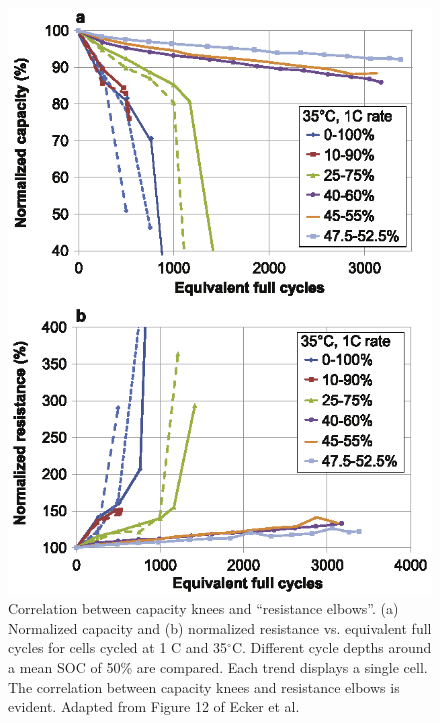 \documentclass[journal=jpclcd,manuscript=article]{achemso}
\begin{document}
\begin{figure}[!ht]
\centering
\includegraphics[scale=1.0]{figures/ecker_capacity_vs_dcr.eps}
\caption{Correlation between capacity knees and ``resistance elbows''.
(a) Normalized capacity and (b) normalized resistance vs. equivalent full cycles for cells cycled at 1 C and 35$^{\circ}$C.
Different cycle depths around a mean SOC of 50\% are compared. Each trend displays a single cell. The correlation between capacity knees and resistance elbows is evident.
Adapted from Figure 12 of Ecker et al.\cite{ecker_calendar_2014}
}
\label{fig:ecker_capacity_and_resistance}
\end{figure}
\end{document}
